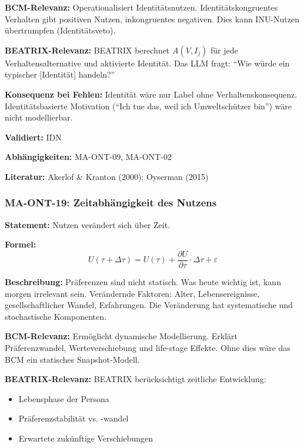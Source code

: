 \textbf{BCM-Relevanz:}
Operationalisiert Identitätsnutzen. Identitätskongruentes Verhalten gibt positiven Nutzen, inkongruentes negativen. Dies kann INU-Nutzen übertrumpfen (Identitätsveto).

\textbf{BEATRIX-Relevanz:}
BEATRIX berechnet $A(V, I_j)$ für jede Verhaltensalternative und aktivierte Identität. Das LLM fragt: ``Wie würde ein typischer [Identität] handeln?''

\textbf{Konsequenz bei Fehlen:}
Identität wäre nur Label ohne Verhaltenskonsequenz. Identitätsbasierte Motivation (``Ich tue das, weil ich Umweltschützer bin'') wäre nicht modellierbar.

\textbf{Validiert:} IDN

\textbf{Abhängigkeiten:} MA-ONT-09, MA-ONT-02

\textbf{Literatur:} Akerlof \& Kranton (2000); Oyserman (2015)


\subsubsection*{MA-ONT-19: Zeitabhängigkeit des Nutzens}

\textbf{Statement:} Nutzen verändert sich über Zeit.

\textbf{Formel:}
\begin{equation}
U(\tau + \Delta\tau) = U(\tau) + \frac{\partial U}{\partial \tau} \cdot \Delta\tau + \varepsilon
\end{equation}

\textbf{Beschreibung:}
Präferenzen sind nicht statisch. Was heute wichtig ist, kann morgen irrelevant sein. Verändernde Faktoren: Alter, Lebensereignisse, gesellschaftlicher Wandel, Erfahrungen. Die Veränderung hat systematische und stochastische Komponenten.

\textbf{BCM-Relevanz:}
Ermöglicht dynamische Modellierung. Erklärt Präferenzwandel, Werteverschiebung und life-stage Effekte. Ohne dies wäre das BCM ein statisches Snapshot-Modell.

\textbf{BEATRIX-Relevanz:}
BEATRIX berücksichtigt zeitliche Entwicklung:
\begin{itemize}
    \item Lebensphase der Persona
    \item Präferenzstabilität vs. -wandel
    \item Erwartete zukünftige Verschiebungen
\end{itemize}

